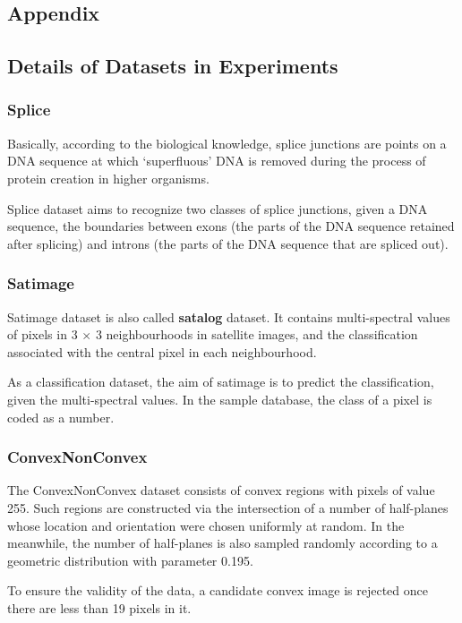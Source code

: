 \documentclass[12pt,a4paper]{article}
\theoremstyle{definition}
\begin{document}
\newpage
\begin{appendix}
\section{Appendix}

\subsection{Details of Datasets in Experiments}
\label{apd:dataset}

\subsubsection{Splice \cite{splice}}

Basically, according to the biological knowledge, splice junctions are points on a DNA sequence at which `superfluous' DNA is removed during the process of protein creation in higher organisms.

\vspace{0.01\linewidth}
Splice dataset aims to recognize two classes of splice junctions, given a DNA sequence, the boundaries between exons (the parts of the DNA sequence retained after splicing) and introns (the parts of the DNA sequence that are spliced out).

\subsubsection{Satimage \cite{satimage}}

Satimage dataset is also called \textbf{satalog} dataset. It contains multi-spectral values of pixels in 3 $\times$ 3 neighbourhoods in satellite images, and the classification associated with the central pixel in each neighbourhood.

\vspace{0.01\linewidth}
As a classification dataset, the aim of satimage is to predict the classification, given the multi-spectral values. In the sample database, the class of a pixel is coded as a number.

\subsubsection{ConvexNonConvex \cite{convex}}

The ConvexNonConvex dataset consists of convex regions with pixels of value 255. Such regions are constructed via the intersection of a number of half-planes whose location and orientation were chosen uniformly at random. In the meanwhile, the number of half-planes is also sampled randomly according to a geometric distribution with parameter 0.195.

\vspace{0.01\linewidth}
To ensure the validity of the data, a candidate convex image is rejected once there are less than 19 pixels in it.


\end{appendix}



\end{document}

